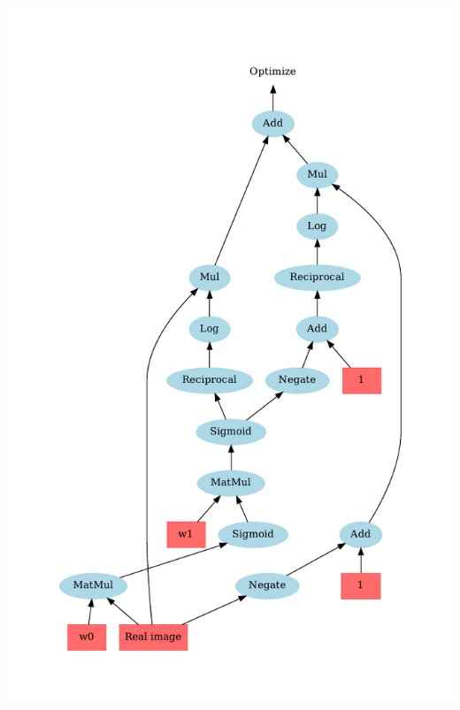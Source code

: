 \documentclass{Bredelebeamer}
\begin{document}
\begin{frame}
\begin{columns}
\begin{column}{0.5\textwidth}
	\includegraphics[width=\textwidth]{cross_entropy_all.pdf}
\end{column}
\end{columns}
\end{frame}
\end{document}
